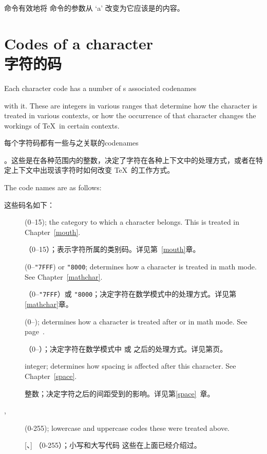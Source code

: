  命令有效地将  命令的参数从 `\n a' 改变为它应该是的内容。



\section{Codes of a character\\字符的码}
\label{codename}

Each character code has a number of s associated
\term codenames\par
with it. These are integers in various ranges that determine
how the character is treated in various contexts, or
how the occurrence of that character changes the workings
of \TeX\ in certain contexts.

每个字符码都有一些与之关联的\term codenames\par。这些是在各种范围内的整数，决定了字符在各种上下文中的处理方式，或者在特定上下文中出现该字符时如何改变 \TeX\ 的工作方式。

The code names are as follows:

这些码名如下：
\begin{description}\item []
 (0--15); the category to which a character belongs.
This is treated in Chapter~\ref{mouth}.

（0--15）；表示字符所属的类别码。详见第~\ref{mouth}章。
\item []
 (0--\verb-"7FFF-) or \verb-"8000-;
determines how a character is treated
in math mode. See Chapter~\ref{mathchar}.

（0--\verb-"7FFF-）或 \verb-"8000-；决定字符在数学模式中的处理方式。详见第\ref{mathchar}章。
\item []
 (0--);
determines how a character is treated after
 or  in math mode.
See page~\pageref{delcodes}.

（0--）；决定字符在数学模式中  或  之后的处理方式。详见第\pageref{delcodes}页。
\item []
integer; determines how spacing is affected after this character.
See Chapter~\ref{space}.

整数；决定字符之后的间距受到的影响。详见第\ref{space}~章。
\item [, ]
 (0-255); lowercase and
uppercase codes \rdash these were treated above.

[、]
（0-255）；小写和大写代码 \rdash 这些在上面已经介绍过。
\end{description}

